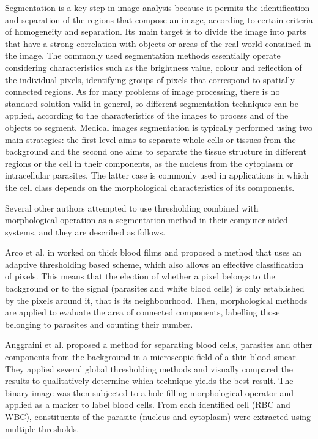 \documentclass[final,a4paper,12pt,english]{UnicaPhdThesis3}
\begin{document}
Segmentation is a key step in image analysis because it permits the identification and separation of the regions that compose an image, according to certain criteria of homogeneity and separation. Its~main target is to divide the image into parts that have a strong correlation with objects or areas of the real world contained in the image.
The commonly used segmentation methods essentially operate considering characteristics such as the brightness value, colour and reflection of the individual pixels, identifying groups of pixels that correspond to spatially connected regions. As for many problems of image processing, there is no standard solution valid in general, so different segmentation techniques can be applied, according to the characteristics of the images to process and of the objects to segment.
Medical images segmentation is typically performed using two main strategies: the first level aims to separate whole cells or tissues from the background and the second one aims to separate the tissue structure in different regions or the cell in their components, as the nucleus from the cytoplasm or intracellular parasites. The latter case is commonly used in applications in which the cell class depends on the morphological characteristics of its components.

Several other authors attempted to use thresholding combined with morphological operation as a segmentation method in their computer-aided systems, and they are described as follows.

Arco et al. in \cite{Arco2014} worked on thick blood films and proposed a method that uses an adaptive thresholding based scheme, which also allows an effective classification of pixels. This means that the election of whether a pixel belongs to the background or to the signal (parasites and white blood cells) is only established by the pixels around it, that is its neighbourhood. Then, morphological methods are applied to evaluate the area of connected components, labelling those belonging to parasites and counting their number.

Anggraini et al. \cite{Anggraini2011} proposed a method for separating blood cells, parasites and other components from the background in a microscopic field of a thin blood smear. They applied several global thresholding methods and visually compared the results to qualitatively determine which technique yields the best result. The binary image was then subjected to a hole filling morphological operator and applied as a marker to label blood cells. From each identified cell (RBC and WBC), constituents of the parasite (nucleus and cytoplasm) were extracted using multiple thresholds.
\end{document}
